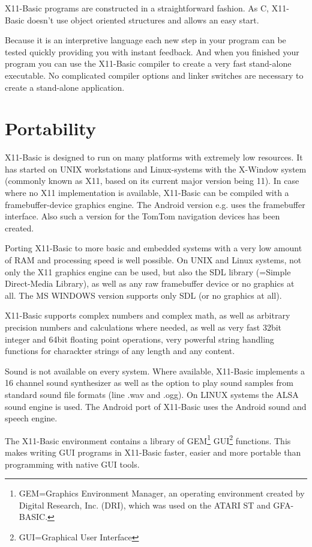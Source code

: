 X11-Basic programs are constructed in a straightforward fashion. As C, X11-Basic
doesn't use object oriented structures and allows an easy start. 

Because it is an interpretive language each new step in your program can be
tested quickly providing you with instant feedback. And when you finished your
program you can use the X11-Basic compiler to create a very fast stand-alone
executable. No complicated compiler options and linker switches are necessary to
create a stand-alone application.

\section*{Portability}

X11-Basic is designed to run on many platforms with extremely low resources.  It
has started on UNIX workstations and Linux-systems with the X-Window system 
(commonly known as X11, based on its current major version being 11).  In case
where no X11 implementation is available, X11-Basic can be compiled with a
framebuffer-device graphics engine. The Android version e.g. uses the
framebuffer interface. Also such a version for the TomTom navigation devices has
been created.

Porting X11-Basic to more basic and embedded systems with a very low amount of
RAM and processing speed is well possible. On UNIX and Linux systems, not  only
the X11 graphics engine can be used, but also the SDL library  (=Simple
Direct-Media Library), as well as any raw framebuffer device or no graphics at
all. The MS WINDOWS version supports only SDL (or no graphics at all).

X11-Basic supports complex numbers and complex math, as well as arbitrary 
precision numbers and calculations where needed, as well as very fast 32bit 
integer and 64bit floating point operations, very powerful string handling 
functions for charackter strings of any length and any content. 

Sound is not available on every system. Where available, X11-Basic implements a 
16 channel sound synthesizer as well as the option to play sound samples from
standard sound file formats (line .wav and .ogg). On LINUX systems the ALSA
sound engine is used. The Android port of X11-Basic uses the Android sound and
speech engine.

The X11-Basic environment contains a library of GEM\footnote{GEM=Graphics
Environment Manager, an operating environment created by Digital Research, Inc.
(DRI), which was used on the ATARI ST and GFA-BASIC.} GUI\footnote{GUI=Graphical
User Interface} functions.  This makes writing GUI programs in X11-Basic faster,
easier and more portable than programming with native GUI tools.

